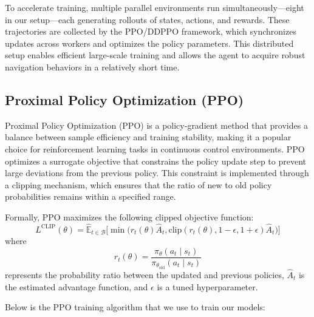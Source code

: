 \documentclass{article} %
\begin{document}
To accelerate training, multiple parallel environments run simultaneously—eight in our setup—each generating rollouts of states, actions, and rewards. These trajectories are collected by the PPO/DDPPO framework, which synchronizes updates across workers and optimizes the policy parameters. This distributed setup enables efficient large-scale training and allows the agent to acquire robust navigation behaviors in a relatively short time.

\subsection{Proximal Policy Optimization (PPO)}
Proximal Policy Optimization (PPO) \cite{schulman2017proximal} is a policy-gradient method that provides a balance between sample efficiency and training stability, making it a popular choice for reinforcement learning tasks in continuous control environments. PPO optimizes a surrogate objective that constrains the policy update step to prevent large deviations from the previous policy. This constraint is implemented through a clipping mechanism, which ensures that the ratio of new to old policy probabilities remains within a specified range.

Formally, PPO maximizes the following clipped objective function:
$$L^{\mathrm{CLIP}}(\theta)=\hat{\mathbb E}_{t\in\mathcal B}\Big[\min\big(r_t(\theta)\hat A_t,\text{clip}(r_t(\theta),1-\epsilon,1+\epsilon)\hat A_t\big)\Big]$$
where 
$$r_t(\theta)=\frac{\pi_\theta(a_t\mid s_t)}{\pi_{\theta_\text{old}}(a_t\mid s_t)}$$ 
represents the probability ratio between the updated and previous policies, $\hat A_t$ is the estimated advantage function, and $\epsilon$ is a tuned hyperparameter.

Below is the PPO training algorithm \cite{MathWorks2025PPO} that we use to train our models:
\end{document}
